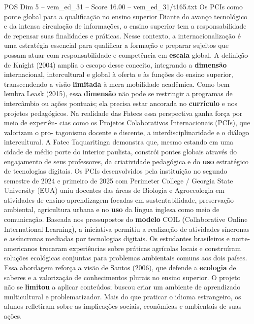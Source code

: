 \begin{textsample}{POS Dim 5 – vem\_ed\_31 – Score 16.00 – vem\_ed\_31/t165.txt}  \label{ex:f5_pos_047}
Os PCIs como ponte global para a qualificação no ensino superior Diante do avanço tecnológico e da intensa circulação de informações, o ensino superior tem a responsabilidade de repensar suas finalidades e práticas.
Nesse contexto, a internacionalização é uma estratégia essencial para qualificar a formação e preparar sujeitos que possam atuar com responsabilidade e competência em \textbf{escala} global.
A definição de Knight (2004) amplia o escopo desse conceito, integrando a \textbf{dimensão} internacional, intercultural e global à oferta e às funções do ensino superior, transcendendo a visão \textbf{limitada} à mera mobilidade acadêmica.
Como bem lembra Leask (2015), essa \textbf{dimensão} não pode se restringir a programas de intercâmbio ou ações pontuais; ela precisa estar ancorada no \textbf{currículo} e nos projetos pedagógicos.
Na realidade das Fatecs essa perspectiva ganha força por meio de experiên- cias como os Projetos Colaborativos Internacionais (PCIs), que valorizam o pro- tagonismo docente e discente, a interdisciplinaridade e o diálogo intercultural.
A Fatec Taquaritinga demonstra que, mesmo estando em uma cidade de médio porte do interior paulista, constrói pontes globais através do engajamento de seus professores, da criatividade pedagógica e do \textbf{uso} estratégico de tecnologias digitais.
Os PCIs desenvolvidos pela instituição no segundo semestre de 2024 e primeiro de 2025 com Perimeter College / Georgia State University (EUA) uniu docentes das áreas de Biologia e Agroecologia em atividades de ensino-aprendizagem focadas em sustentabilidade, preservação ambiental, agricultura urbana e no \textbf{uso} da língua inglesa como meio de comunicação.
Baseada nos pressupostos do \textbf{modelo} COIL (Collaborative Online International Learning), a iniciativa permitiu a realização de atividades síncronas e assíncronas mediadas por tecnologias digitais.
Os estudantes brasileiros e norte-americanos trocaram experiências sobre práticas agrícolas locais e construíram soluções ecológicas conjuntas para problemas ambientais comuns aos dois países.
Essa abordagem reforça a visão de Santos (2006), que defende a \textbf{ecologia} de saberes e a valorização de conhecimentos plurais no ensino superior.
O projeto não se \textbf{limitou} a aplicar conteúdos; buscou criar um ambiente de aprendizado multicultural e problematizador.
Mais do que praticar o idioma estrangeiro, os alunos refletiram sobre as implicações sociais, econômicas e ambientais de suas ações.

\end{textsample}
